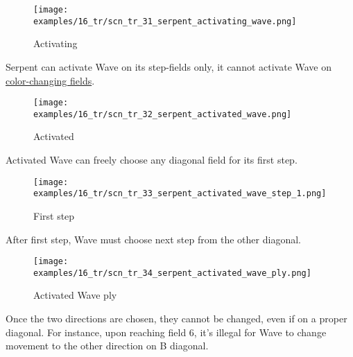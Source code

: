 \vspace*{-0.7\baselineskip}
\noindent
\begin{wrapfigure}[3]{l}{0.4\textwidth}
\centering
\texttt{[image: examples/16\_tr/scn\_tr\_31\_serpent\_activating\_wave.png]}
\vspace*{-0.4\baselineskip}
\caption{Activating}
\label{fig:scn_tr_31_serpent_activating_wave}
\end{wrapfigure}
Serpent can activate Wave on its step-fields only, it cannot activate Wave
on \hyperref[fig:scn_tr_17_serpent_neighbors]{color-changing fields}.

\vspace*{7.0\baselineskip}
\noindent
\begin{wrapfigure}[2]{l}{0.4\textwidth}
\centering
\texttt{[image: examples/16\_tr/scn\_tr\_32\_serpent\_activated\_wave.png]}
\vspace*{-0.4\baselineskip}
\caption{Activated}
\label{fig:scn_tr_32_serpent_activated_wave}
\end{wrapfigure}
Activated Wave can freely choose any diagonal field for its first step.

\vspace*{8.0\baselineskip}
\noindent
\begin{wrapfigure}[2]{l}{0.4\textwidth}
\centering
\texttt{[image: examples/16\_tr/scn\_tr\_33\_serpent\_activated\_wave\_step\_1.png]}
\vspace*{-0.4\baselineskip}
\caption{First step}
\label{fig:scn_tr_33_serpent_activated_wave_step_1}
\end{wrapfigure}
After first step, Wave must choose next step from the other diagonal.

\clearpage %

\noindent
\begin{figure}[!h]
\texttt{[image: examples/16\_tr/scn\_tr\_34\_serpent\_activated\_wave\_ply.png]}
\caption{Activated Wave ply}
\label{fig:scn_tr_34_serpent_activated_wave_ply}
\end{figure}

Once the two directions are chosen, they cannot be changed, even if on a
proper diagonal. For instance, upon reaching field 6, it's illegal for Wave
to change movement to the other direction on B diagonal.

